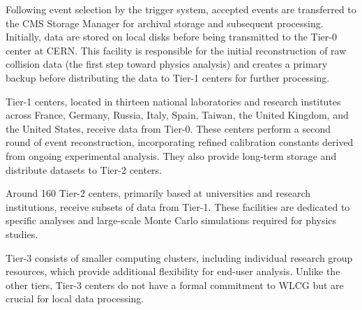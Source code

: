 Following event selection by the trigger system, accepted events are transferred to the CMS Storage Manager for archival storage and subsequent processing. Initially, data are stored on local disks before being transmitted to the Tier-0 center at CERN. This facility is responsible for the initial reconstruction of raw collision data (the first step toward physics analysis) and creates a primary backup before distributing the data to Tier-1 centers for further processing.

Tier-1 centers, located in thirteen national laboratories and research institutes across France, Germany, Russia, Italy, Spain, Taiwan, the United Kingdom, and the United States, receive data from Tier-0. These centers perform a second round of event reconstruction, incorporating refined calibration constants derived from ongoing experimental analysis. They also provide long-term storage and distribute datasets to Tier-2 centers.

Around 160 Tier-2 centers, primarily based at universities and research institutions, receive subsets of data from Tier-1. These facilities are dedicated to specific analyses and large-scale Monte Carlo simulations required for physics studies.

Tier-3 consists of smaller computing clusters, including individual research group resources, which provide additional flexibility for end-user analysis. Unlike the other tiers, Tier-3 centers do not have a formal commitment to WLCG but are crucial for local data processing.





